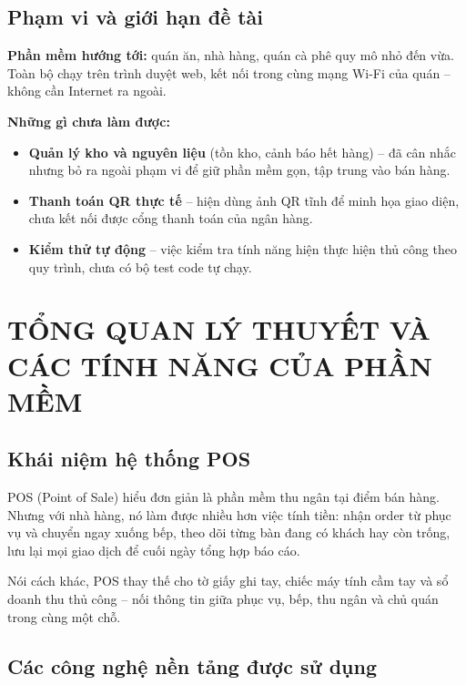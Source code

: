 \documentclass[12pt,a4paper]{report}
\begin{document}
\section{Phạm vi và giới hạn đề tài}

\textbf{Phần mềm hướng tới:} quán ăn, nhà hàng, quán cà phê quy mô nhỏ đến vừa. Toàn bộ chạy trên trình duyệt web, kết nối trong cùng mạng Wi-Fi của quán -- không cần Internet ra ngoài.

\textbf{Những gì chưa làm được:}
\begin{itemize}
  \item \textbf{Quản lý kho và nguyên liệu} (tồn kho, cảnh báo hết hàng) -- đã cân nhắc nhưng bỏ ra ngoài phạm vi để giữ phần mềm gọn, tập trung vào bán hàng.
  \item \textbf{Thanh toán QR thực tế} -- hiện dùng ảnh QR tĩnh để minh họa giao diện, chưa kết nối được cổng thanh toán của ngân hàng.
  \item \textbf{Kiểm thử tự động} -- việc kiểm tra tính năng hiện thực hiện thủ công theo quy trình, chưa có bộ test code tự chạy.
\end{itemize}

\chapter{TỔNG QUAN LÝ THUYẾT VÀ CÁC TÍNH NĂNG CỦA PHẦN MỀM}

\section{Khái niệm hệ thống POS}

POS (Point of Sale) hiểu đơn giản là phần mềm thu ngân tại điểm bán hàng. Nhưng với nhà hàng, nó làm được nhiều hơn việc tính tiền: nhận order từ phục vụ và chuyển ngay xuống bếp, theo dõi từng bàn đang có khách hay còn trống, lưu lại mọi giao dịch để cuối ngày tổng hợp báo cáo.

Nói cách khác, POS thay thế cho tờ giấy ghi tay, chiếc máy tính cầm tay và sổ doanh thu thủ công -- nối thông tin giữa phục vụ, bếp, thu ngân và chủ quán trong cùng một chỗ.

\section{Các công nghệ nền tảng được sử dụng}
\end{document}
